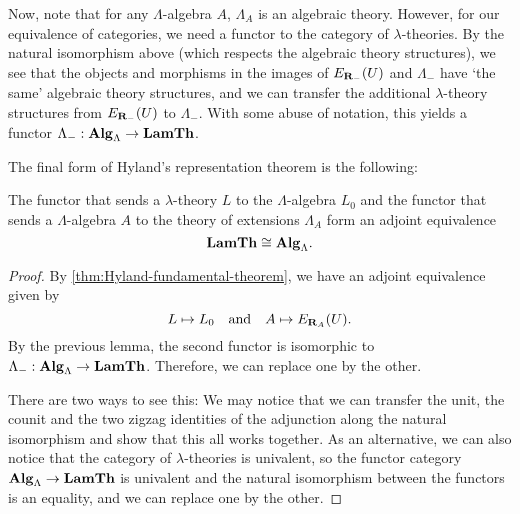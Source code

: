\begin{remark}
  Now, note that for any $ \Lambda $-algebra $ A $, $ \Lambda_A $ is an algebraic theory. However, for our equivalence of categories, we need a functor to the category of $ \lambda $-theories. By the natural isomorphism above (which respects the algebraic theory structures), we see that the objects and morphisms in the images of $ E_{\mathbf{R}_-}(U) $ and $ \Lambda_- $ have `the same' algebraic theory structures, and we can transfer the additional $ \lambda $-theory structures from $ E_{\mathbf{R}_-}(U) $ to $ \Lambda_- $. With some abuse of notation, this yields a functor $ \Lambda_- : \mathbf{Alg}_{\Lambda} \to \mathbf{LamTh} $.
\end{remark}

The final form of Hyland's representation theorem is the following:
\begin{theorem}
  The functor that sends a $ \lambda $-theory $ L $ to the $ \Lambda $-algebra $ L_0 $ and the functor that sends a $ \Lambda $-algebra $ A $ to the theory of extensions $ \Lambda_A $ form an adjoint equivalence
  \[ \mathbf{LamTh} \cong \mathbf{Alg}_{\Lambda}. \]
\end{theorem}
\begin{proof}
  By \ref{thm:Hyland-fundamental-theorem}, we have an adjoint equivalence given by
  \[ L \mapsto L_0 \quad \text{and} \quad A \mapsto E_{\mathbf{R}_A}(U). \]
  By the previous lemma, the second functor is isomorphic to $ \Lambda_-: \mathbf{Alg}_{\Lambda} \to \mathbf{LamTh} $. Therefore, we can replace one by the other.

  There are two ways to see this: We may notice that we can transfer the unit, the counit and the two zigzag identities of the adjunction along the natural isomorphism and show that this all works together. As an alternative, we can also notice that the category of $ \lambda $-theories is univalent, so the functor category $ \mathbf{Alg}_{\Lambda} \to \mathbf{LamTh} $ is univalent and the natural isomorphism between the functors is an equality, and we can replace one by the other.
\end{proof}
